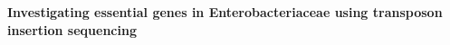\documentclass[12pt,letterpaper]{article}
\begin{document}
\vspace*{0.35in}

\begin{flushleft}
{\Large
\textbf{Investigating essential genes in Enterobacteriaceae using
transposon insertion sequencing}
}
\newline
\\

\end{flushleft}%
\end{document}
